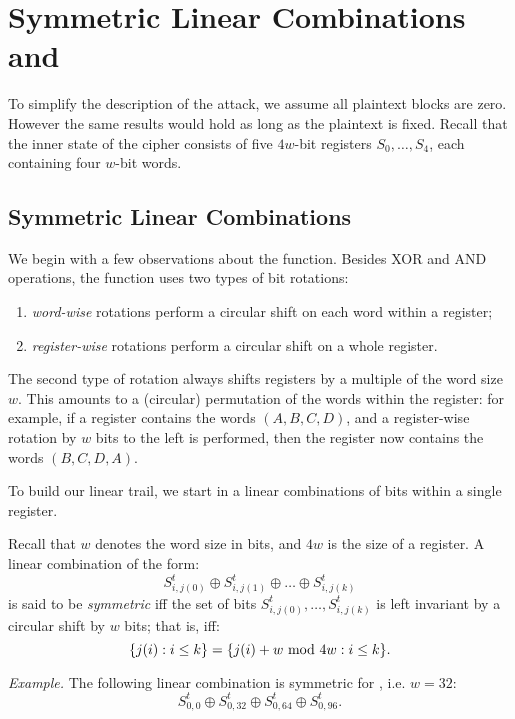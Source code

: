 
\section{Symmetric Linear Combinations and \MiniMORUS}
\label{sec/introminimorus}

To simplify the description of the attack, we assume all plaintext blocks are zero. However the same results would hold as long as the plaintext is fixed. Recall that the inner state of the cipher consists of five $4w$-bit registers $S_0,\dots,S_4$, each containing four $w$-bit words.

\subsection{Symmetric Linear Combinations}

We begin with a few observations about the \StateUpdate{} function. Besides XOR and AND operations, the \StateUpdate{} function uses two types of bit rotations:
\begin{enumerate}
\item \emph{word-wise} rotations perform a circular shift on each word within a register;
\item \emph{register-wise} rotations perform a circular shift on a whole register.
\end{enumerate}
The second type of rotation always shifts registers by a multiple of the word size $w$. This amounts to a (circular) permutation of the words within the register: for example, if a register contains the words $(A, B, C, D)$, and a register-wise rotation by $w$ bits to the left is performed, then the register now contains the words $(B, C, D, A)$.

To build our linear trail, we start in a linear combinations of bits within a single register.
\begin{definition}
Recall that $w$ denotes the word size in bits, and $4w$ is the size of a register. A linear combination of the form:
\[
S^t_{i,j(0)} \oplus S^t_{i,j(1)} \oplus \dots \oplus S^t_{i,j(k)}
\]
is said to be \emph{symmetric} iff the set of bits $S^t_{i,j(0)}, \dots, S^t_{i,j(k)}$ is left invariant by a circular shift by $w$ bits; that is, iff:
\[
\{j(i) : i\leq k\} = \{j(i) + w \text{\rm{} mod } 4w : i\leq k\}.
\]
\end{definition}
\emph{Example.} The following linear combination is symmetric for \MORUS[640], i.e. $w = 32$:
\begin{equation}
S^t_{0,0} \oplus S^t_{0,32} \oplus S^t_{0,64} \oplus S^t_{0,96}.
\label{eq:symmetric}
\end{equation}

